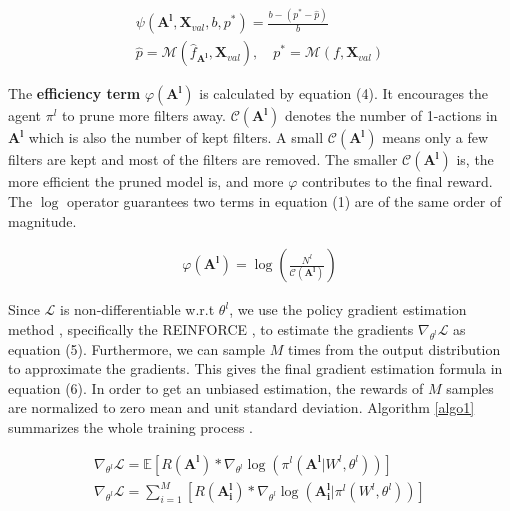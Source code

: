 \documentclass[10pt,twocolumn,letterpaper]{article}
\begin{document}
 \begin{gather}
    \psi(\mathbf{A^l}, \mathbf{X}_{val}, b, p^*) = \frac{ b - (p^* - \hat{p})}{b} \\
    \hat{p} = \mathcal{M}(\hat{f}_{\mathbf{A^l}},\mathbf{X}_{val}), \quad  p^* = \mathcal{M}(f, \mathbf{X}_{val})
\end{gather}


The \textbf{efficiency term} $\varphi(\mathbf{A^l})$ is calculated by equation (4). It encourages the agent $\pi^l$ to prune more filters away. $\mathcal{C}(\mathbf{A^l}) $ denotes the number of 1-actions in $\mathbf{A^l}$ which is also the number of kept filters. A small $\mathcal{C}(\mathbf{A^l}) $ means only a few filters are kept and most of the filters are removed. The smaller $\mathcal{C}(\mathbf{A^l}) $ is, the more efficient the pruned model is, and more $\varphi$ contributes to the final reward. The $\log$ operator guarantees two terms in equation (1) are of the same order of magnitude.

 \begin{gather}
   \varphi(\mathbf{A^l}) = \log( \frac{N^l}{ \mathcal{C}(\mathbf{A^l}) } )
\end{gather}


Since $\mathcal{L}$ is non-differentiable w.r.t $\theta^l$, we use the policy gradient estimation method \cite{pg}, specifically the REINFORCE \cite{reinforce}, to estimate the gradients $\nabla_{\theta^l}\mathcal{L}$ as equation (5). Furthermore, we can sample $M$ times from the output distribution to approximate the gradients. This gives the final gradient estimation formula in equation (6). In order to get an unbiased estimation, the rewards of $M$ samples are normalized to zero mean and unit standard deviation. Algorithm \ref{algo1} summarizes the whole training process .


 \begin{gather}
    \nabla_{\theta^l}\mathcal{L} = \mathbb{E}[R(\mathbf{A^l}) * \nabla_{\theta^l} \log(\pi^l(\mathbf{A^l}|W^l, \theta^l))] \\
    \nabla_{\theta^l}\mathcal{L} = \sum_{i=1}^{M}[ R(\mathbf{A_i^l} ) * \nabla_{\theta^l} \log( \mathbf{A_i^l}  | \pi^l(W^l,\theta^l)) ]
\end{gather}
\end{document}

